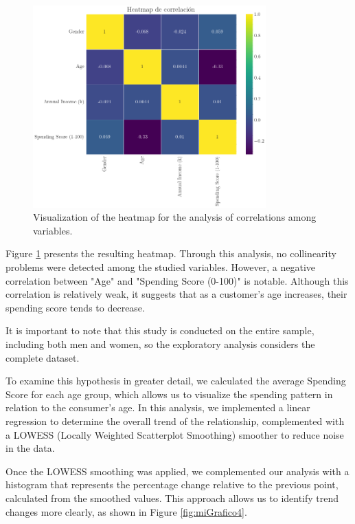 \documentclass[10pt]{article}
\begin{document}
\begin{figure}[h]
    \centering
    \includegraphics[width=0.8\textwidth]{plots_investing/Grafico 3.png}
    \caption{Visualization of the heatmap for the analysis of correlations among variables.}
    \label{fig:miGrafico3}
\end{figure}

Figure \ref{fig:miGrafico3} presents the resulting heatmap. Through this analysis, no collinearity problems were detected among the studied variables. However, a negative correlation between "Age" and "Spending Score (0-100)" is notable. Although this correlation is relatively weak, it suggests that as a customer's age increases, their spending score tends to decrease.

It is important to note that this study is conducted on the entire sample, including both men and women, so the exploratory analysis considers the complete dataset.

To examine this hypothesis in greater detail, we calculated the average Spending Score for each age group, which allows us to visualize the spending pattern in relation to the consumer's age. In this analysis, we implemented a linear regression to determine the overall trend of the relationship, complemented with a LOWESS (Locally Weighted Scatterplot Smoothing) smoother to reduce noise in the data.

Once the LOWESS smoothing was applied, we complemented our analysis with a histogram that represents the percentage change relative to the previous point, calculated from the smoothed values. This approach allows us to identify trend changes more clearly, as shown in Figure \ref{fig:miGrafico4}.
\end{document}
